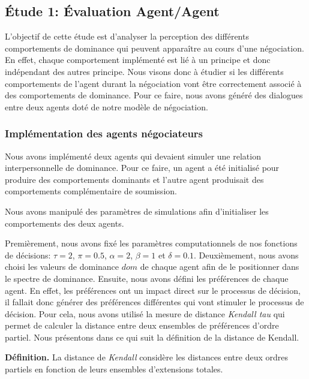 		\subsection{Étude 1: Évaluation Agent/Agent}
				L'objectif de cette étude est d'analyser la perception des différents comportements de dominance qui peuvent apparaître au cours d'une négociation. En effet, chaque comportement implémenté est lié à un principe et donc indépendant des autres principe. Nous visons donc à étudier si les différents comportements de l'agent durant la négociation vont être correctement associé à des comportements de dominance. Pour ce faire, nous avons généré des dialogues entre deux agents doté de notre modèle de négociation. 
			
			\subsubsection{Implémentation des agents négociateurs}
				Nous avons implémenté deux agents qui devaient simuler une relation interpersonnelle de dominance. Pour ce faire, un agent a été initialisé pour produire des comportements dominants et l'autre agent produisait des comportements complémentaire de soumission. 
				
				
				Nous avons manipulé des paramètres de simulations afin d'initialiser les comportements des deux agents.
				
				Premièrement, nous avons fixé les paramètres computationnels de nos fonctions de décisions: $\tau=2$, $\pi=0.5$, $\alpha=2$, $\beta=1$ et $\delta=0.1$. 
				Deuxièmement, nous avons choisi les valeurs de dominance $dom$ de chaque agent afin de le positionner dans le spectre de dominance. 
				Ensuite, nous avons défini les préférences de chaque agent. En effet, les préférences ont un impact direct sur le processus de décision, il fallait donc générer des préférences différentes qui vont stimuler le processus de décision. Pour cela, nous avons utilisé la mesure de distance \emph{Kendall tau} \cite{bra2013Kendall} qui permet de calculer la distance entre deux ensembles de préférences d'ordre partiel. 
				Nous présentons dans ce qui suit la définition de la distance de Kendall. 
				
				\vspace{1 em}
				\textbf{Définition. }
				La distance de \emph{Kendall} considère les distances entre deux ordres partiels en fonction de leurs ensembles d'extensions totales.
				
